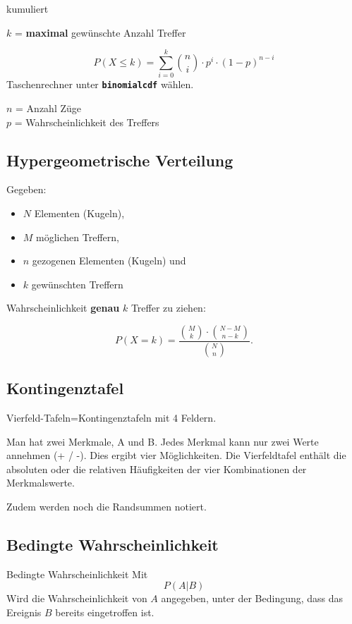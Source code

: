 \begin{multicols}{2}
\begin{gesetz*}{kumuliert}{}

$k$ = \textbf{maximal} gewünschte Anzahl Treffer


$$P(X\le k) = \sum_{i=0}^{k}{n \choose i}\cdot{}p^i\cdot{}(1-p)^{n-i}$$
Taschenrechner
unter  \textbf{\texttt{binomialcdf}} wählen.

$n$ = Anzahl Züge\\
$p$ = Wahrscheinlichkeit des Treffers\\
\end{gesetz*}

\forceCB
\subsection*{Hypergeometrische Verteilung}
Gegeben:
\begin{itemize}
\item $N$ Elementen (Kugeln),
\item $M$ möglichen Treffern,
\item $n$ gezogenen Elementen (Kugeln) und 
\item $k$ gewünschten Treffern
\end{itemize}
Wahrscheinlichkeit \textbf{genau} $k$ Treffer zu ziehen:

$$P(X=k) = \frac{ {M \choose k} \cdot {{N-M}  \choose {n-k}} }{{N \choose n}}.$$


\subsection*{Kontingenztafel}
Vierfeld-Tafeln=Kontingenztafeln mit 4 Feldern.

Man hat zwei Merkmale, A und B. Jedes Merkmal kann nur zwei Werte
annehmen (+ / -). Dies ergibt vier Möglichkeiten. Die Vierfeldtafel
enthält die absoluten oder die relativen Häufigkeiten der vier
Kombinationen der Merkmalswerte.

Zudem werden noch die Randsummen notiert.


\subsection*{Bedingte Wahrscheinlichkeit}

\begin{definition*}{Bedingte Wahrscheinlichkeit}{}
Mit
$$P(A|B)$$
Wird die Wahrscheinlichkeit von $A$ angegeben, unter der Bedingung,
dass das Ereignis $B$ bereits eingetroffen ist.
\end{definition*}


\end{multicols}
